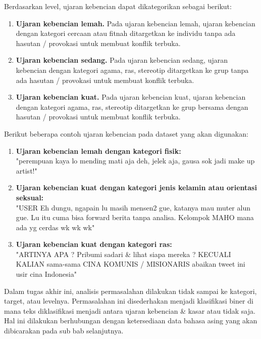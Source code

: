 	Berdasarkan level, ujaran kebencian dapat dikategorikan sebagai berikut:
	\begin{enumerate}
		\item \textbf{Ujaran kebencian lemah.} Pada ujaran kebencian lemah, ujaran kebencian dengan kategori cercaan atau fitnah ditargetkan ke individu tanpa ada hasutan / provokasi untuk membuat konflik terbuka.
		\item \textbf{Ujaran kebencian sedang.} Pada ujaran kebencian sedang, ujaran kebencian dengan kategori agama, ras, stereotip ditargetkan ke grup tanpa ada hasutan / provokasi untuk membuat konflik terbuka.
		\item \textbf{Ujaran kebencian kuat.} Pada ujaran kebencian kuat, ujaran kebencian dengan kategori agama, ras, stereotip ditargetkan ke grup bersama dengan hasutan / provokasi untuk membuat konflik terbuka.
	\end{enumerate}

	Berikut beberapa contoh ujaran kebencian pada dataset yang akan digunakan:
	
	\begin{enumerate}
		\item \textbf{Ujaran kebencian lemah dengan kategori fisik:} \\ 
		"perempuan kaya lo mending mati aja deh, jelek aja, gausa sok jadi make up artist!"

		\item \textbf{Ujaran kebencian kuat dengan kategori jenis kelamin atau orientasi seksual:} \\
		"USER Eh dungu, ngapain lu masih mensen2 gue, katanya mau muter alun gue. Lu itu cuma bisa forward berita tanpa analisa. Kelompok MAHO mana ada yg cerdas wk wk wk"

		\item \textbf{Ujaran kebencian kuat dengan kategori ras:} \\ 
		"ARTINYA APA ? Pribumi sadari \& lihat siapa mereka ? KECUALI KALIAN sama-sama CINA KOMUNIS / MISIONARIS abaikan tweet ini usir cina Indonesia"
	\end{enumerate}

	Dalam tugas akhir ini, analisis permasalahan dilakukan tidak sampai ke kategori, target, atau levelnya. Permasalahan ini disederhakan menjadi klasifikasi biner di mana teks diklasifikasi menjadi antara ujaran kebencian \& kasar atau tidak saja. Hal ini dilakukan berhubungan dengan ketersediaan data bahasa asing yang akan dibicarakan pada sub bab selanjutnya.

